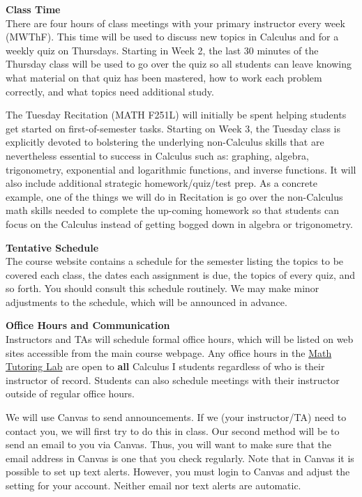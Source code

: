 \documentclass[12pt]{article}
\renewcommand{\emph}[1]{\textsf{\textbf{#1}}}
\newcommand{\localhead}[1]{\par\smallskip\textbf{#1}\nobreak\\}%
\def\heading#1{\localhead{\large\emph{#1}}}
\begin{document}
\newpage

\heading{Class Time}
There are four hours of class meetings with your primary instructor every week (MWThF). This time will be used to discuss new topics in Calculus and for a weekly quiz on Thursdays. Starting in Week 2, the last 30 minutes of the Thursday class will be used to go over the quiz so all students can leave knowing what material on that quiz has been mastered, how to work each problem correctly,  and what topics need additional study. 

The Tuesday Recitation (MATH F251L) will initially be spent helping students get started on first-of-semester tasks. Starting on Week 3, the Tuesday class is explicitly devoted to bolstering the underlying non-Calculus skills that are nevertheless essential to success in Calculus such as: graphing, algebra, trigonometry, exponential and logarithmic functions, and inverse functions. It will also include additional strategic homework/quiz/test prep. As a concrete example, one of the things we will do in Recitation is go over the non-Calculus math skills needed to complete the up-coming homework so that students can focus on the Calculus instead of getting bogged down in algebra or trigonometry.

\heading{Tentative Schedule}
The course website contains a %
schedule for the semester listing
the topics to be covered each class, the dates each assignment is due,
the topics of every quiz, and so forth. You should consult this schedule
routinely.  We may make minor adjustments to the schedule, which
will be announced in advance.

\heading{Office Hours and Communication}
Instructors and TAs will schedule formal office hours, which will be listed on web sites accessible from the main course webpage. Any office hours in the \href{https://uaf.edu/dms/mathlab/}{Math Tutoring Lab} are open to \emph{all} Calculus I students regardless of who is their instructor of record. Students can also schedule meetings with their instructor outside of regular office hours.

We will use Canvas to send announcements. If we (your instructor/TA) need to contact you, we will first try to do this in class. Our second method will be to send an email to you via Canvas. Thus, you will want to make sure that the email address in Canvas is one that you check regularly. Note that in Canvas it is possible to set up text alerts. However, you must login to Canvas and adjust the setting for your account. Neither email nor text alerts are automatic.
\end{document}
